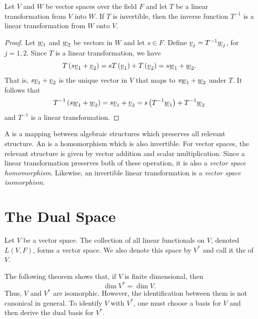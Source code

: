 \begin{theorem}
Let $V$ and $W$ be vector spaces over the field $F$ and let $T$ be a linear transformation from $V$ into $W$.
If $T$ is invertible, then the inverse function $T^{-1}$ is a linear transformation from $W$ onto $V$.
\end{theorem}
\begin{proof}
Let $\underline{w}_1$ and $\underline{w}_2$ be vectors in $W$ and let $s \in F$.
Define $\underline{v}_j = T^{-1} \underline{w}_j$, for $j =1,2$.
Since $T$ is a linear transformation, we have
\begin{equation*}
T \left( s \underline{v}_1 + \underline{v}_2 \right)
= s T \left( \underline{v}_1 \right) + T \left( \underline{v}_2 \right)
= s \underline{w}_1 + \underline{w}_2.
\end{equation*}
That is, $s \underline{v}_1 + \underline{v}_2$ is the unique vector in $V$ that maps to $s \underline{w}_1 + \underline{w}_2$ under $T$.
It follows that
\begin{equation*}
T^{-1} \left( s \underline{w}_1 + \underline{w}_2 \right)
= s \underline{v}_1 + \underline{v}_2
= s \left( T^{-1} \underline{w}_1 \right) + T^{-1} \underline{w}_2
\end{equation*}
and $T^{-1}$ is a linear transformation.
\end{proof}

A  is a mapping between algebraic structures which preserves all relevant structure.
An  is a homomorphism which is also invertible.
For vector spaces, the relevant structure is given by vector addition and scalar multiplication.
Since a linear transformation preserves both of these operation, it is also a \emph{vector space homomorphism}.
Likewise, an invertible linear transformation is a \emph{vector space isomorphism}.

\section{The Dual Space}

\begin{definition}
Let $V$ be a vector space.
The collection of all linear functionals on $V$, denoted $L(V,F)$, forms a vector space.
We also denote this space by $V^*$ and call it the  of $V$.
\end{definition}

The following theorem shows that, if $V$ is finite dimensional, then
\begin{equation*}
\dim V^* = \dim V.
\end{equation*}
Thus, $V$ and $V^*$ are isomorphic.
However, the identification between them is not canonical in general.
To identify $V$ with $V^*$, one must choose a basis for $V$ and then derive the dual basis for $V^*$.

